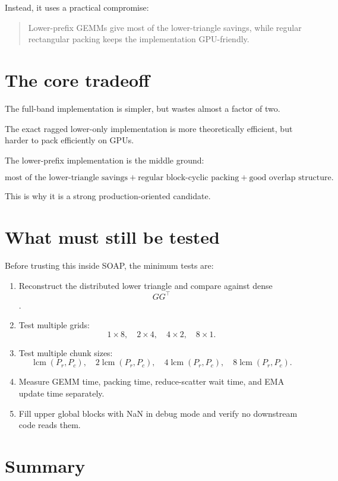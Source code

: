 \documentclass[11pt]{article}
\begin{document}
Instead, it uses a practical compromise:

\begin{quote}
Lower-prefix GEMMs give most of the lower-triangle savings, while regular rectangular packing keeps the implementation GPU-friendly.
\end{quote}

\section{The core tradeoff}

The full-band implementation is simpler, but wastes almost a factor of two.

The exact ragged lower-only implementation is more theoretically efficient, but harder to pack efficiently on GPUs.

The lower-prefix implementation is the middle ground:

$$
\text{most of the lower-triangle savings}
+
\text{regular block-cyclic packing}
+
\text{good overlap structure}.
$$

This is why it is a strong production-oriented candidate.

\section{What must still be tested}

Before trusting this inside SOAP, the minimum tests are:

\begin{enumerate}
    \item Reconstruct the distributed lower triangle and compare against dense $$GG^\top$$.
    \item Test multiple grids:
    $$
    1 \times 8,\quad 2 \times 4,\quad 4 \times 2,\quad 8 \times 1.
    $$
    \item Test multiple chunk sizes:
    $$
    \operatorname{lcm}(P_r,P_c),\quad
    2\operatorname{lcm}(P_r,P_c),\quad
    4\operatorname{lcm}(P_r,P_c),\quad
    8\operatorname{lcm}(P_r,P_c).
    $$
    \item Measure GEMM time, packing time, reduce-scatter wait time, and EMA update time separately.
    \item Fill upper global blocks with NaN in debug mode and verify no downstream code reads them.
\end{enumerate}

\section{Summary}
\end{document}
